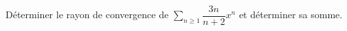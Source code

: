 \documentclass[a4paper,10pt]{report}
\newcommand{\Sum}[2]{\ensuremath{\textstyle{\sum\limits_{#1}^{#2}}}}
\begin{document}

\begin{Exercice}{} Déterminer le rayon de convergence de $\Sum{n\geq 1}{} \dfrac{3n}{n+2} x^n$ et déterminer sa somme.
\end{Exercice}

\end{document}
